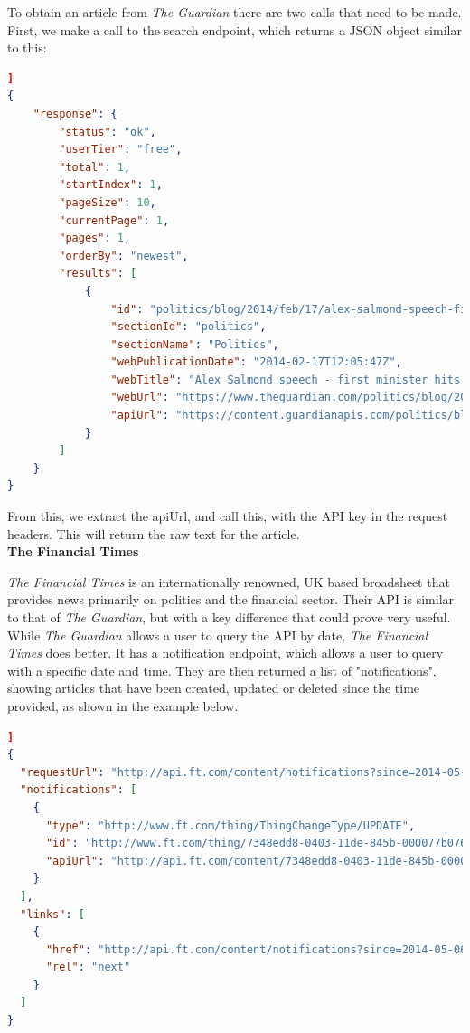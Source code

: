 \documentclass[12pt]{article}
\begin{document}
To obtain an article from \emph{The Guardian} there are two calls that need to be made. First, we make a call to the search endpoint, which returns a JSON object similar to this:

\begin{lstlisting}[language=json, firstnumber=1]]
{
    "response": {
        "status": "ok",
        "userTier": "free",
        "total": 1,
        "startIndex": 1,
        "pageSize": 10,
        "currentPage": 1,
        "pages": 1,
        "orderBy": "newest",
        "results": [
            {
                "id": "politics/blog/2014/feb/17/alex-salmond-speech-first-minister-scottish-independence-eu-currency-live",
                "sectionId": "politics",
                "sectionName": "Politics",
                "webPublicationDate": "2014-02-17T12:05:47Z",
                "webTitle": "Alex Salmond speech - first minister hits back over Scottish independence - live",
                "webUrl": "https://www.theguardian.com/politics/blog/2014/feb/17/alex-salmond-speech-first-minister-scottish-independence-eu-currency-live",
                "apiUrl": "https://content.guardianapis.com/politics/blog/2014/feb/17/alex-salmond-speech-first-minister-scottish-independence-eu-currency-live"
            }
        ]
    }
} 
\end{lstlisting}

From this, we extract the apiUrl, and call this, with the API key in the request headers. This will return the raw text for the article. \\

\textbf{The Financial Times}

\emph{The Financial Times} is an internationally renowned, UK based broadsheet that provides news primarily on politics and the financial sector. Their API is similar to that of \emph{The Guardian}, but with a key difference that could prove very useful. While \emph{The Guardian} allows a user to query the API by date, \emph{The Financial Times} does better. It has a notification endpoint, which allows a user to query with a specific date and time. They are then returned a list of "notifications", showing articles that have been created, updated or deleted since the time provided, as shown in the example below.

\begin{lstlisting}[language=json, firstnumber=1]]
{
  "requestUrl": "http://api.ft.com/content/notifications?since=2014-05-06T10:00:00.000Z",
  "notifications": [
    {
      "type": "http://www.ft.com/thing/ThingChangeType/UPDATE",
      "id": "http://www.ft.com/thing/7348edd8-0403-11de-845b-000077b07658",
      "apiUrl": "http://api.ft.com/content/7348edd8-0403-11de-845b-000077b07658"
    }
  ],
  "links": [
    {
      "href": "http://api.ft.com/content/notifications?since=2014-05-06T18:42:35.000Z",
      "rel": "next"
    }
  ]
}
\end{lstlisting}
\end{document}
